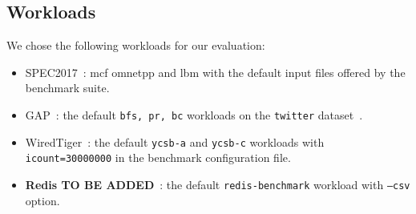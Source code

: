 \subsection{Workloads}

We chose the following workloads for our evaluation:\begin{itemize}
    \item SPEC2017~\cite{SPEC2017}: mcf omnetpp and lbm with the default input files offered by the benchmark suite.
    \item GAP~\cite{gapbs}: the default \texttt{bfs, pr, bc} workloads on the \texttt{twitter} dataset~\cite{twitter-dataset}.
    \item WiredTiger~\cite{wiredtiger}: the default \texttt{ycsb-a} and \texttt{ycsb-c} workloads with \texttt{icount=30000000} in the benchmark configuration file.
    \item \textbf{Redis TO BE ADDED}~\cite{redis}: the default \texttt{redis-benchmark} workload with \texttt{--csv} option.
\end{itemize}




